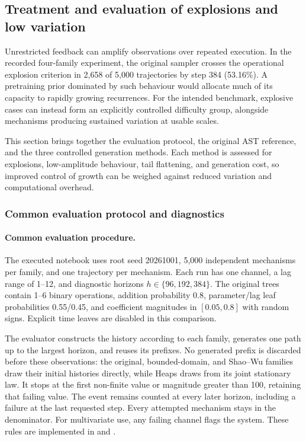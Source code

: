 \subsection{Treatment and evaluation of explosions and low variation}
\label{sec:generator-diagnostics}

Unrestricted feedback can amplify observations over repeated execution.
In the recorded four-family experiment, the original sampler crosses the
operational explosion criterion in 2,658 of 5,000 trajectories by step 384
(53.16\%). A pretraining prior dominated by such behaviour would allocate much
of its capacity to rapidly growing recurrences. For the intended benchmark,
explosive cases can instead form an explicitly controlled difficulty group,
alongside mechanisms producing sustained variation at usable scales.

This section brings together the evaluation protocol, the original AST
reference, and the three controlled generation methods. Each method is
assessed for explosions, low-amplitude behaviour, tail flattening, and generation cost, so
improved control of growth can be weighed against reduced variation and
computational overhead.

\subsubsection{Common evaluation protocol and diagnostics}
\label{sec:generator-evaluation-protocol}

\paragraph{Common evaluation procedure.}
The executed notebook
uses root seed 20261001, 5,000 independent mechanisms per family, and one
trajectory per mechanism. Each run has one channel, a lag range of 1--12,
and diagnostic horizons $h\in\{96,192,384\}$. The original trees contain
1--6 binary operations, addition probability 0.8, parameter/lag leaf
probabilities 0.55/0.45, and coefficient magnitudes in $[0.05,0.8]$ with
random signs. Explicit time leaves are disabled in this comparison.

The evaluator constructs the history according to each family, generates one
path up to the largest horizon, and reuses its prefixes. No generated prefix
is discarded before these observations: the original, bounded-domain, and
Shao--Wu families draw their initial histories directly, while Heaps draws
from its joint stationary law. It stops at the first
non-finite value or magnitude greater than 100, retaining that failing value.
The event remains counted at every later horizon, including a failure at the
last requested step. Every attempted mechanism stays in the denominator.
For multivariate use, any failing channel flags the system. These rules are
implemented in  and
.

